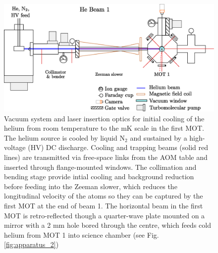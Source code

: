 	\begin{figure}
		\centering
		\includegraphics[width=\textwidth]{fig/apparatus/vacuum_schematic_split_1}
		\caption{Vacuum system and laser insertion optics for initial cooling of the helium from room temperature to the mK scale in the first MOT. The helium source is cooled by liquid $\textrm{N}_2$ and sustained by a high-voltage (HV) DC discharge.
		Cooling and trapping beams (solid red lines) are transmitted via free-space links from the AOM table and inserted through flange-mounted windows.
		The collimation and bending stage provide intial cooling and background reduction before feeding into the Zeeman slower, which reduces the longitudinal velocity of the atoms so they can be captured by the first MOT at the end of beam 1. 
		The horizontal beam in the first MOT is retro-reflected though a quarter-wave plate mounted on a mirror with a 2 mm hole bored through the centre, which feeds cold helium from MOT 1 into science chamber (see Fig. \ref{fig:apparatus_2})}
		\label{fig:apparatus}
	\end{figure}

